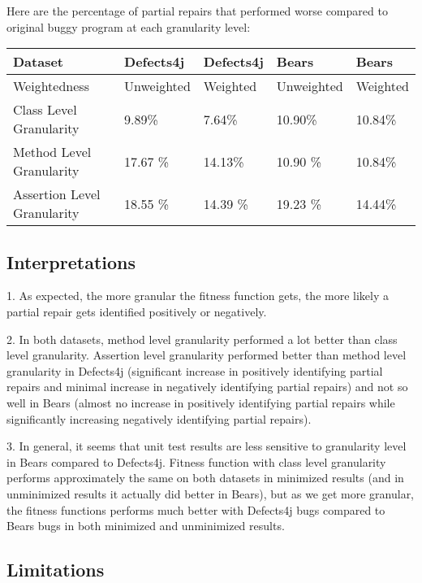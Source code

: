 \documentclass[sigconf, timestamp-false, anonymous=true]{acmart}
\begin{document}
    Here are the percentage of partial repairs that performed worse compared to original buggy program at each granularity level:
    
    \begin{tabular}{| l | l | l | l | l |} \hline
    Dataset & Defects4j & Defects4j & Bears & Bears  \\ \hline
    Weightedness & Unweighted & Weighted & Unweighted & Weighted \\ \hline
    Class Level Granularity & 9.89\% & 7.64\% & 10.90\% & 10.84\%\\
    Method Level Granularity & 17.67 \% & 14.13\% & 10.90 \% & 10.84\% \\
    Assertion Level Granularity & 18.55 \% & 14.39 \% & 19.23 \% & 14.44\% \\
    \hline
    
    \end{tabular}
    
\subsection{Interpretations}

1. As expected, the more granular the fitness function gets, the more likely a partial repair gets identified positively or negatively.

2. In both datasets, method level granularity performed a lot better than class level granularity. Assertion level granularity performed better than method level granularity in Defects4j (significant increase in positively identifying partial repairs and minimal increase in negatively identifying partial repairs) and not so well in Bears (almost no increase in positively identifying partial repairs while significantly increasing negatively identifying partial repairs).

3. In general, it seems that unit test results are less sensitive to granularity level in Bears compared to Defects4j. Fitness function with class level granularity performs approximately the same on both datasets in minimized results (and in unminimized results it actually did better in Bears), but as we get more granular, the fitness functions performs much better with Defects4j bugs compared to Bears bugs in both minimized and unminimized results.

\subsection{Limitations}
\end{document}
